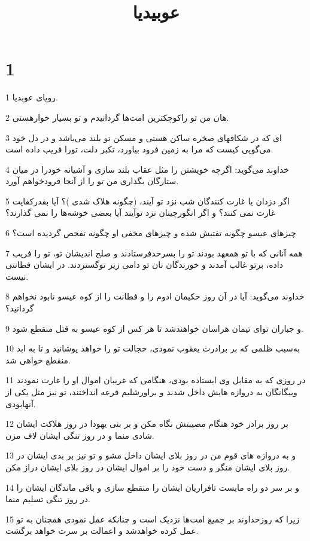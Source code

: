 

\title{عوبيديا}


\chapter{1}

\par 1 رویای عوبدیا.
\par 2 هان من تو راکوچکترین امت‌ها گردانیدم و تو بسیار خوارهستی.
\par 3 ‌ای که در شکافهای صخره ساکن هستی و مسکن تو بلند می‌باشد و در دل خود می‌گویی کیست که مرا به زمین فرود بیاورد، تکبر دلت، تورا فریب داده است.
\par 4 خداوند می‌گوید: اگرچه خویشتن را مثل عقاب بلند سازی و آشیانه خودرا در میان ستارگان بگذاری من تو را از آنجا فرودخواهم آورد.
\par 5 اگر دزدان یا غارت کنندگان شب نزد تو آیند، (چگونه هلاک شدی )؟ آیا بقدرکفایت غارت نمی کنند؟ و اگر انگورچینان نزد توآیند آیا بعضی خوشه‌ها را نمی گذارند؟
\par 6 چیزهای عیسو چگونه تفتیش شده و چیزهای مخفی او چگونه تفحص گردیده است؟
\par 7 همه آنانی که با تو همعهد بودند تو را بسرحدفرستادند و صلح اندیشان تو، تو را فریب داده، برتو غالب آمدند و خورندگان نان تو دامی زیر توگستردند. در ایشان فطانتی نیست.
\par 8 خداوند می‌گوید: آیا در آن روز حکیمان ادوم را و فطانت را از کوه عیسو نابود نخواهم گردانید؟
\par 9 و جباران تو‌ای تیمان هراسان خواهندشد تا هر کس از کوه عیسو به قتل منقطع شود.
\par 10 به‌سبب ظلمی که بر برادرت یعقوب نمودی، خجالت تو را خواهد پوشانید و تا به ابد منقطع خواهی شد.
\par 11 در روزی که به مقابل وی ایستاده بودی، هنگامی که غریبان اموال او را غارت نمودند وبیگانگان به دروازه هایش داخل شدند و براورشلیم قرعه انداختند، تو نیز مثل یکی از آنهابودی.
\par 12 بر روز برادر خود هنگام مصیبتش نگاه مکن و بر بنی یهودا در روز هلاکت ایشان شادی منما و در روز تنگی ایشان لاف مزن.
\par 13 و به دروازه های قوم من در روز بلای ایشان داخل مشو و تو نیز بر بدی ایشان در روز بلای ایشان منگر و دست خود را بر اموال ایشان در روز بلای ایشان دراز مکن.
\par 14 و بر سر دو راه مایست تافراریان ایشان را منقطع سازی و باقی ماندگان ایشان را در روز تنگی تسلیم منما.
\par 15 زیرا که روزخداوند بر جمیع امت‌ها نزدیک است و چنانکه عمل نمودی همچنان به تو عمل کرده خواهدشد و اعمالت بر سرت خواهد برگشت.
